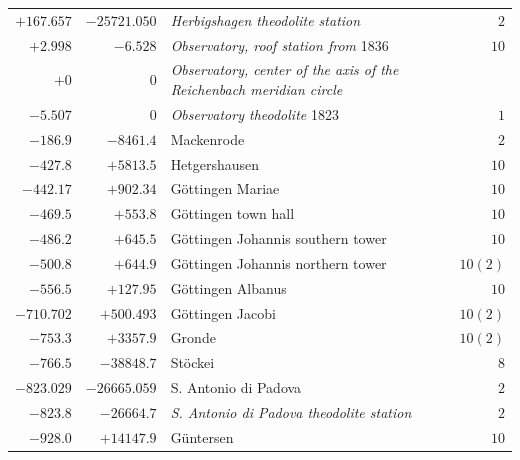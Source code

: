 \begin{center}
\begin{tabular}{r|r|p{170pt}|r}
\(+167.657\)&\(-25721.050\)&\textit{Herbigshagen theodolite station}&\(2\)\\
\(+2.998\)&\(-6.528\)&\textit{Observatory, roof station from} 1836&\(10\)\\
\(+0\)&\(0\)&\textit{Observatory, center of the axis of the Reichenbach meridian circle}&\\
\(-5.507\)&\(0\)&\textit{Observatory theodolite} 1823&\(1\)\\
\(-186.9\)&\(-8461.4\)&Mackenrode&\(2\)\\
\(-427.8\)&\(+5813.5\)&Hetgershausen&\(10\)\\
\(-442.17\)&\(+902.34\)&Göttingen Mariae&\(10\)\\
\(-469.5\)&\(+553.8\)&Göttingen town hall&\(10\)\\
\(-486.2\)&\(+645.5\)&Göttingen Johannis southern tower&\(10\)\\
\(-500.8\)&\(+644.9\)&Göttingen Johannis northern tower&\(10(2)\)\\
\(-556.5\)&\(+127.95\)&Göttingen Albanus&\(10\)\\
\(-710.702\)&\(+500.493\)&Göttingen Jacobi&\(10(2)\)\\
\(-753.3\)&\(+3357.9\)&Gronde&\(10(2)\)\\
\(-766.5\)&\(-38848.7\)&Stöckei&\(8\)\\
\(-823.029\)&\(-26665.059\)&S. Antonio di Padova&\(2\)\\
\(-823.8\)&\(-26664.7\)&\textit{S. Antonio di Padova theodolite station}&\(2\)\\
\(-928.0\)&\(+14147.9\)&Güntersen&\(10\)\\
\hline\end{tabular}\endgroup\end{center}
